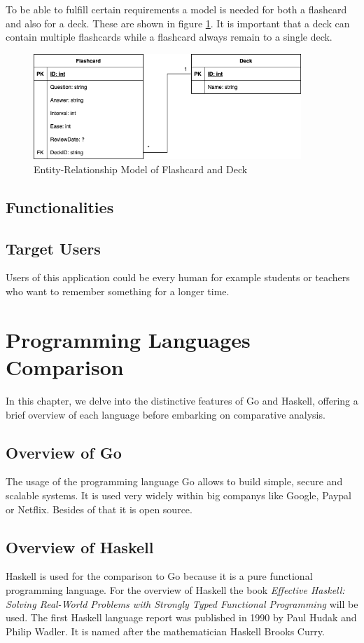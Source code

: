 To be able to fulfill certain requirements a model is needed for both a flashcard and also for a deck. These are shown in figure \ref{fig:er-model}. It is important that a deck can contain multiple flashcards while a flashcard always remain to a single deck.

\begin{figure}
    \centering
    \includegraphics[width=0.9\textwidth]{NerddeckModel.png}
    \caption{Entity-Relationship Model of Flashcard and Deck}
    \label{fig:er-model}
\end{figure}

    \section{Functionalities}\label{sec:functionalities}
    \section{Target Users}\label{sec:target-users}
Users of this application could be every human for example students or teachers who want to remember something for a longer time. 


\chapter{Programming Languages Comparison}\label{chap:language-comparison}
In this chapter, we delve into the distinctive features of Go and Haskell, offering a brief overview of each language before embarking on comparative analysis.

    \section{Overview of Go}\label{sec:go-overview}
The usage of the programming language Go allows to build simple, secure and scalable systems. It is used very widely within big companys like Google, Paypal or Netflix. Besides of that it is open source. \cite{GoWebsite}
    \section{Overview of Haskell}\label{sec:haskell-overview}
Haskell is used for the comparison to Go because it is a pure functional programming language.
For the overview of Haskell the book \textit{Effective Haskell: Solving Real-World Problems with Strongly Typed Functional Programming} \cite{Skinner} will be used.
The first Haskell language report was published in 1990 by Paul Hudak and Philip Wadler. It is named after the mathematician Haskell Brooks Curry.\cite{Hudak2007}

